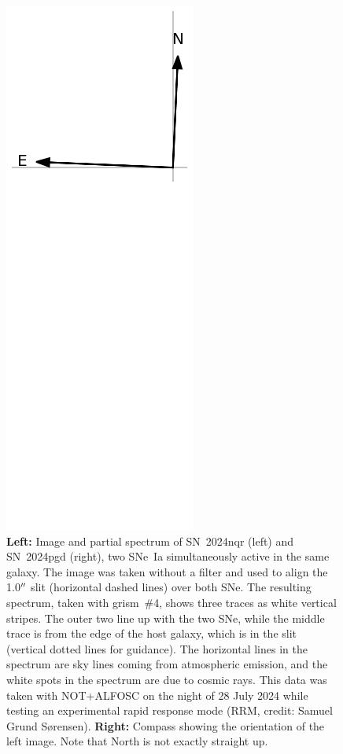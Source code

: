 \documentclass[a4paper,oneside,12pt, class=Latex/Classes/PhDthesisPSnPDF, crop=false]{standalone}
\begin{document}
\begin{figure}
    \includegraphics[height=0.81\textheight]{../Images/chapter_2/example_compass.png}
    \caption[Image and partial spectrum of SN~2024nqr and SN~2024pgd.]{\textbf{Left:} Image and partial spectrum of SN~2024nqr (left) and SN~2024pgd (right), two SNe~Ia simultaneously active in the same galaxy. The image was taken without a filter and used to align the 1.0$^{\prime\prime}$ slit (horizontal dashed lines) over both SNe. The resulting spectrum, taken with grism~\#4, shows three traces as white vertical stripes. The outer two line up with the two SNe, while the middle trace is from the edge of the host galaxy, which is in the slit (vertical dotted lines for guidance). The horizontal lines in the spectrum are sky lines coming from atmospheric emission, and the white spots in the spectrum are due to cosmic rays. This data was taken with NOT+ALFOSC on the night of 28 July 2024 while testing an experimental rapid response mode (RRM, credit: Samuel Grund S\o rensen). \textbf{Right:} Compass showing the orientation of the left image. Note that North is not exactly straight up.}
    \label{phot_spec_example}
\end{figure}
\end{document}
